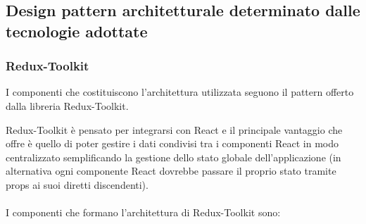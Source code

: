 \subsection{Design pattern architetturale determinato dalle tecnologie adottate}
\label{design Redux}

\subsubsection{Redux-Toolkit}
I componenti che costituiscono l'architettura utilizzata seguono il pattern offerto dalla libreria Redux-Toolkit.

Redux-Toolkit è pensato per integrarsi con React e il principale vantaggio che offre è quello di poter gestire i dati condivisi tra 
i componenti React in modo centralizzato semplificando la gestione dello stato globale dell'applicazione 
(in alternativa ogni componente React dovrebbe passare il proprio stato tramite props ai suoi diretti discendenti).
\\\\
I componenti che formano l'architettura di Redux-Toolkit sono:

